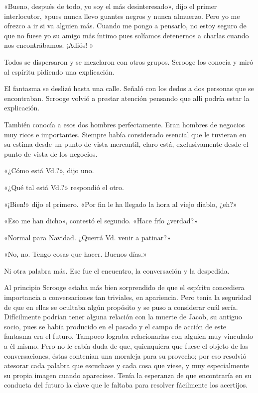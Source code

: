 \documentclass{novela}
\begin{document}
 «Bueno, después de todo, yo soy el más desinteresado», dijo el primer interlocutor, «pues nunca llevo guantes negros y nunca almuerzo. Pero yo me ofrezco a ir si va alguien más. Cuando me pongo a pensarlo, no estoy seguro de que no fuese yo su amigo más íntimo pues solíamos detenernos a charlas cuando nos encontrábamos. ¡Adiós! »

 Todos se dispersaron y se mezclaron con otros grupos. Scrooge los conocía y miró al espíritu pidiendo una explicación.

 El fantasma se deslizó hasta una calle. Señaló con los dedos a dos personas que se encontraban. Scrooge volvió a prestar atención pensando que allí podría estar la explicación.

 También conocía a esos dos hombres perfectamente. Eran hombres de negocios muy ricos e importantes. Siempre había considerado esencial que le tuvieran en su estima desde un punto de vista mercantil, claro está, exclusivamente desde el punto de vista de los negocios.

 «¿Cómo está Vd.?», dijo uno.

 «¿Qué tal está Vd.?» respondió el otro.

 «¡Bien!» dijo el primero. «Por fin le ha llegado la hora al viejo diablo, ¿eh?»

 «Eso me han dicho», contestó el segundo. «Hace frío ¿verdad?»

 «Normal para Navidad. ¿Querrá Vd. venir a patinar?»

 «No, no. Tengo cosas que hacer. Buenos días.»

 Ni otra palabra más. Ese fue el encuentro, la conversación y la despedida.

 Al principio Scrooge estaba más bien sorprendido de que el espíritu concediera importancia a conversaciones tan triviales, en apariencia. Pero tenía la seguridad de que en ellas se ocultaba algún propósito y se puso a considerar cuál sería. Difícilmente podrían tener alguna relación con la muerte de Jacob, su antiguo socio, pues se había producido en el pasado y el campo de acción de este fantasma era el futuro. Tampoco lograba relacionarlas con alguien muy vinculado a él mismo. Pero no le cabía duda de que, quienquiera que fuese el objeto de las conversaciones, éstas contenían una moraleja para su provecho; por eso resolvió atesorar cada palabra que escuchase y cada cosa que viese, y muy especialmente su propia imagen cuando apareciese. Tenía la esperanza de que encontraría en su conducta del futuro la clave que le faltaba para resolver fácilmente los acertijos.
\end{document}
